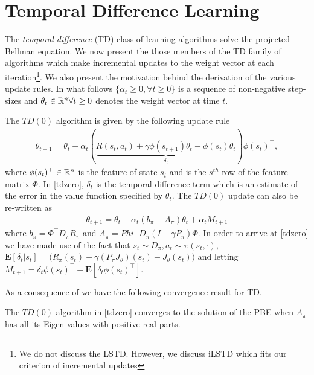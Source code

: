 \section{Temporal Difference Learning}
The \emph{temporal difference} (TD) class of learning algorithms solve the projected Bellman equation. We now present the those members of the TD family of algorithms which make incremental updates to the weight vector at each iteration\footnote{We do not discuss the LSTD. However, we discuss iLSTD which fits our criterion of incremental updates}. We also present the motivation behind the derivation of the various update rules. In what follows $\{\alpha_t \geq 0,\forall t\geq 0\}$ is a sequence of non-negative step-sizes and $\theta_t\in \mathbb{R}^n \forall t\geq 0$ denotes the weight vector at time $t$.\par
The $TD(0)$ algorithm is given by the following update rule
\begin{align}\label{tdzero}
\theta_{t+1}=\theta_t+\alpha_t(\underbrace{R(s_t,a_t)+\gamma \phi(s_{t+1})\theta_t-\phi(s_t)\theta_t}_{{\delta_t}}){\phi(s_t)}^\top,
\end{align}
where $\phi(s_t)^\top \in \mathbb{R}^n$ is the feature of state $s_t$ and is the $s^{th}$ row of the feature matrix $\Phi$. In \eqref{tdzero}, $\delta_t$ is the temporal difference term which is an estimate of the error in the value function specified by $\theta_t$. The $TD(0)$ update can also be re-written as
\begin{align}\label{tdzero}
\theta_{t+1}=\theta_t+\alpha_t(b_\pi-A_\pi)\theta_t+\alpha_t M_{t+1}
\end{align}
where $b_\pi=\Phi^\top D_\pi R_\pi$ and $A_\pi=Phi^\top D_\pi (I-\gamma P_\pi)\Phi$. In order to arrive at \eqref{tdzero} we have made use of the fact that $s_t\sim D_\pi, a_t\sim\pi(s_t,\cdot)$, $\mathbf{E}[\delta_t|s_t]= \big(R_\pi(s_t)+\gamma (P_\pi J_\theta)(s_t) -J_\theta(s_t)\big)$ and letting $M_{t+1}=\delta_t\phi(s_t)^\top-\mathbf{E}[\delta_t{\phi(s_t)}^\top]$.\par
As a consequence of  we have the following convergence result for TD.
\begin{theorem}[Convergence of TD]\label{tdconv}
The $TD(0)$ algorithm in \eqref{tdzero} converges to the solution of the PBE when $A_\pi$ has all its Eigen values with positive real parts.
\end{theorem}

